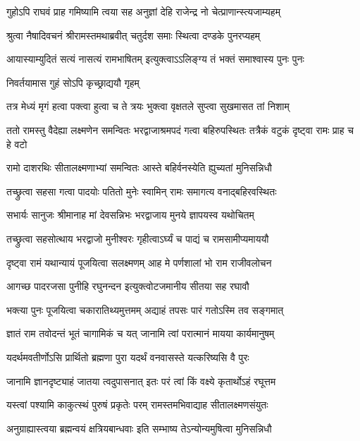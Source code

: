 \twolineshloka
{गुहोऽपि राघवं प्राह गमिष्यामि त्वया सह}
{अनुज्ञां देहि राजेन्द्र नो चेत्प्राणान्स्त्यजाम्यहम्} %

\twolineshloka
{श्रुत्वा नैषादिवचनं श्रीरामस्तमथाब्रवीत्}
{चतुर्दश समाः स्थित्वा दण्डके पुनरप्यहम्} %

\twolineshloka
{आयास्याम्युदितं सत्यं नासत्यं रामभाषितम्}
{इत्युक्त्वाऽऽलिङ्ग्य तं भक्तं समाश्वास्य पुनः पुनः} %

\onelineshloka
{निवर्तयामास गुहं सोऽपि कृच्छ्राद्ययौ गृहम्} %

\twolineshloka
{तत्र मेध्यं मृगं हत्वा पक्त्वा हुत्वा च ते त्रयः}
{भुक्त्वा वृक्षतले सुप्त्वा सुखमासत तां निशाम्} %

\threelineshloka
{ततो रामस्तु वैदेह्या लक्ष्मणेन समन्वितः}
{भरद्वाजाश्रमपदं गत्वा बहिरुपस्थितः}
{तत्रैकं वटुकं दृष्ट्वा रामः प्राह च हे वटो} %

\twolineshloka
{रामो दाशरथिः सीतालक्ष्मणाभ्यां समन्वितः}
{आस्ते बहिर्वनस्येति ह्युच्यतां मुनिसन्निधौ} %

\twolineshloka
{तच्छ्रुत्वा सहसा गत्वा पादयोः पतितो मुनेः}
{स्वामिन् रामः समागत्य वनाद्बहिरवस्थितः} %

\twolineshloka
{सभार्यः सानुजः श्रीमानाह मां देवसन्निभः}
{भरद्वाजाय मुनये ज्ञापयस्व यथोचितम्} %

\twolineshloka
{तच्छ्रुत्वा सहसोत्थाय भरद्वाजो मुनीश्वरः}
{गृहीत्वाऽर्घ्यं च पाद्यं च रामसामीप्यमाययौ} %

\twolineshloka
{दृष्ट्वा रामं यथान्यायं पूजयित्वा सलक्ष्मणम्}
{आह मे पर्णशालां भो राम राजीवलोचन} %

\twolineshloka
{आगच्छ पादरजसा पुनीहि रघुनन्दन}
{इत्युक्त्वोटजमानीय सीतया सह रघावौ} %

\twolineshloka
{भक्त्या पुनः पूजयित्वा चकारातिथ्यमुत्तमम्}
{अद्याहं तपसः पारं गतोऽस्मि तव सङ्गमात्} %

\twolineshloka
{ज्ञातं राम तवोदन्तं भूतं चागामिकं च यत्}
{जानामि त्वां परात्मानं मायया कार्यमानुषम्} %

\twolineshloka
{यदर्थमवतीर्णोऽसि प्रार्थितो ब्रह्मणा पुरा}
{यदर्थं वनवासस्ते यत्करिष्यसि वै पुरः} %

\twolineshloka
{जानामि ज्ञानदृष्ट्याहं जातया त्वदुपासनात्}
{इतः परं त्वां किं वक्ष्ये कृतार्थोऽहं रघूत्तम} %

\twolineshloka
{यस्त्वां पश्यामि काकुत्स्थं पुरुषं प्रकृतेः परम्}
{रामस्तमभिवाद्याह सीतालक्ष्मणसंयुतः} %

\twolineshloka
{अनुग्राह्यास्त्वया ब्रह्मन्वयं क्षत्रियबान्धवाः}
{इति सम्भाष्य तेऽन्योन्यमुषित्वा मुनिसन्निधौ} %

